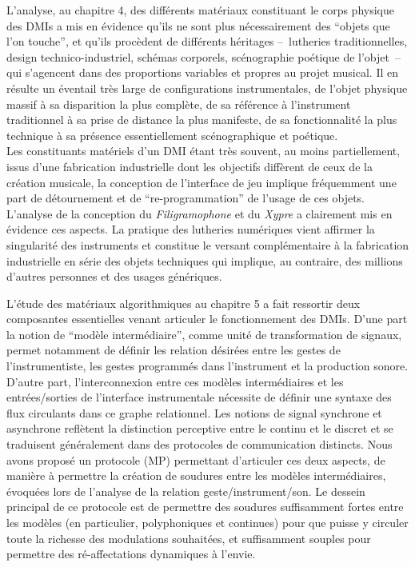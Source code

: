 \noindent L'analyse, au chapitre 4, des différents matériaux constituant le corps physique des \glspl{DMI} a mis en évidence qu'ils ne sont plus nécessairement des ``objets que l'on touche'', et qu'ils procèdent de différents héritages --~lutheries traditionnelles, design technico-industriel, schémas corporels, scénographie poétique de l'objet~-- qui s'agencent dans des proportions variables et propres au projet musical. Il en résulte un éventail très large de configurations instrumentales, de l'objet physique massif à sa disparition la plus complète, de sa référence à l'instrument traditionnel à sa prise de distance la plus manifeste, de sa fonctionnalité la plus technique à sa présence essentiellement scénographique et poétique.\\
\indent Les constituants matériels d'un \gls{DMI} étant très souvent, au moins partiellement, issus d'une fabrication industrielle dont les objectifs diffèrent de ceux de la création musicale, la conception de l'interface de jeu implique fréquemment une part de détournement et de ``re-programmation'' de l'usage de ces objets. L'analyse de la conception du \textit{Filigramophone} et du \textit{Xypre} a clairement mis en évidence ces aspects. La pratique  des lutheries numériques vient affirmer la singularité des instruments et constitue le versant complémentaire à la fabrication industrielle en série des objets techniques qui implique, au contraire, des millions d'autres personnes et des usages génériques.



\noindent L'étude des matériaux algorithmiques au chapitre 5 a fait ressortir deux composantes essentielles venant articuler le fonctionnement des \glspl{DMI}. D'une part la notion de ``modèle intermédiaire'', comme unité de transformation de signaux, permet notamment de définir les relation désirées entre les gestes de l'instrumentiste, les gestes programmés dans l'instrument et la production sonore. D'autre part, l'interconnexion entre ces modèles intermédiaires et les entrées/sorties de l'interface instrumentale nécessite de définir une syntaxe des flux circulants dans ce graphe relationnel. Les notions de signal synchrone et asynchrone reflètent la distinction perceptive entre le continu et le discret et se traduisent généralement dans des protocoles de communication distincts. Nous avons proposé un protocole (MP) permettant d'articuler ces deux aspects, de manière à permettre la création de soudures entre les modèles intermédiaires, évoquées lors de l'analyse de la relation geste/instrument/son. Le dessein principal de ce protocole est de permettre des soudures suffisamment fortes entre les modèles (en particulier, polyphoniques et continues) pour que puisse y circuler toute la richesse des modulations souhaitées, et suffisamment souples pour permettre des ré-affectations dynamiques à l'envie.

